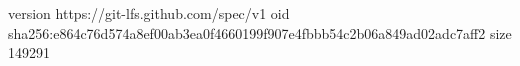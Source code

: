 version https://git-lfs.github.com/spec/v1
oid sha256:e864c76d574a8ef00ab3ea0f4660199f907e4fbbb54c2b06a849ad02adc7aff2
size 149291
